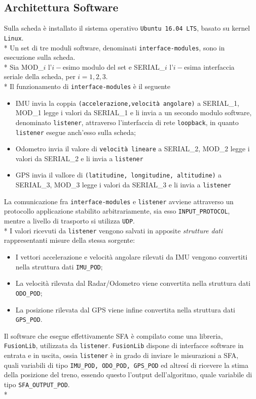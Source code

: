 \subsection{Architettura Software}
Sulla scheda \`e installato il sistema operativo \texttt{Ubuntu 16.04 LTS}, basato su kernel \texttt{Linux}.\\*
Un set di tre moduli software, denominati \texttt{interface-modules}, sono in esecuzione sulla scheda.\\*
Sia MOD\_$i$ l'$i-$esimo modulo del set e SERIAL\_$i$ l'$i-$esima interfaccia seriale della scheda, per $i = 1,2,3$.\\*
Il funzionamento di \texttt{interface-modules} \`e il seguente
\begin{itemize}
	\item IMU invia la coppia \texttt{(accelerazione,velocit\`a angolare)} a SERIAL\_1, MOD\_1 legge i valori da SERIAL\_1 e li invia a un secondo modulo software, denominato \texttt{listener}, attraverso l'interfaccia di rete \texttt{loopback}, in quanto \texttt{listener} esegue anch'esso sulla scheda;
	\item Odometro invia il valore di \texttt{velocit\`a lineare} a SERIAL\_2, MOD\_2 legge i valori da SERIAL\_2 e li invia a \texttt{listener}
	\item GPS invia il vallore di \texttt{(latitudine, longitudine, altitudine)} a SERIAL\_3, MOD\_3 legge i valori da SERIAL\_3 e li invia a \texttt{listener}
\end{itemize}
La comunicazione fra \texttt{interface-modules} e \texttt{listener} avviene attraverso un protocollo applicazione stabilito arbitrariamente, sia esso \texttt{INPUT\_PROTOCOL}, mentre a livello di trasporto si utilizza \texttt{UDP}.\\*
I valori ricevuti da \texttt{listener} vengono salvati in apposite \emph{strutture dati} rappresentanti misure della stessa sorgente:
\begin{itemize}
\item I vettori accelerazione e velocit\`a angolare rilevati da IMU vengono convertiti nella struttura dati \texttt{IMU\_POD};
\item La velocit\`a rilevata dal Radar/Odometro viene convertita nella struttura dati \texttt{ODO\_POD};
\item La posizione rilevata dal GPS viene infine convertita nella struttura dati \texttt{GPS\_POD}.
\end{itemize}
Il software che esegue effettivamente SFA \`e compilato come una libreria, \texttt{FusionLib}, utilizzata da \texttt{listener}. \texttt{FusionLib} dispone di interfacce software in entrata e in uscita, ossia \texttt{listener} \`e in grado di inviare le misurazioni a SFA, quali variabili di tipo \texttt{IMU\_POD, ODO\_POD, GPS\_POD} ed altres\'i di ricevere la stima della posizione del treno, essendo questo l'output dell'algoritmo, quale variabile di tipo \texttt{SFA\_OUTPUT\_POD}.\\*
